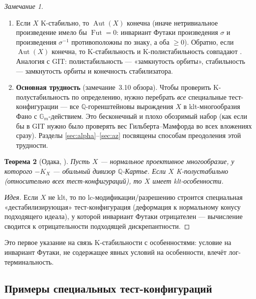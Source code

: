 \documentclass[11pt,a4paper]{article}
\theoremstyle{plain}
\newtheorem{theorem}{Теорема}[section]
\theoremstyle{definition}
\theoremstyle{remark}
\newtheorem{remark}[theorem]{Замечание}
\newcommand{\Q}{\mathbb{Q}}
\newcommand{\Gm}{\mathbb{G}_m}
\DeclareMathOperator{\Aut}{Aut}
\DeclareMathOperator{\Fut}{Fut}
\begin{document}
\begin{remark}\label{rem:BX}
\begin{enumerate}
\item Если $X$ K-стабильно, то $\Aut(X)$ конечна (иначе нетривиальное произведение имело бы
$\Fut=0$: инвариант Футаки произведения $\sigma$ и произведения $\sigma^{-1}$ противоположны по
знаку, а оба $\ge0$). Обратно, если $\Aut(X)$ конечна, то K-стабильность и K-полистабильность
совпадают \cite[BX19]{BX}. Аналогия с GIT: полистабильность --- «замкнутость орбиты»,
стабильность --- замкнутость орбиты и конечность стабилизатора.
\item \textbf{Основная трудность} (замечание~3.10 обзора). Чтобы проверить K-полустабильность по
определению, нужно перебрать \emph{все} специальные тест-конфигурации --- все $\Q$-горенштейновы
вырождения $X$ в klt-многообразия Фано с $\Gm$-действием. Это бесконечный и плохо обозримый набор
(как если бы в GIT нужно было проверять вес Гильберта--Мамфорда во всех вложениях сразу). Разделы
\ref{sec:alpha}--\ref{sec:az} посвящены способам преодоления этой трудности.
\end{enumerate}
\end{remark}

\begin{theorem}[{Одака, \cite{Oda13}}]\label{thm:Odaka}
Пусть $X$ --- нормальное проективное многообразие, у которого $-K_X$ --- обильный дивизор $\Q$-Картье. Если $X$
K-полустабильно \textup{(}относительно всех тест-конфигураций\textup{)}, то $X$ имеет klt-особенности.
\end{theorem}

\begin{proof}[Идея]
Если $X$ не klt, то по lc-модификации/разрешению строится специальная «дестабилизирующая»
тест-конфигурация (деформация к нормальному конусу подходящего идеала), у которой инвариант Футаки
отрицателен --- вычисление сводится к отрицательности подходящей дискрепантности.
\end{proof}

Это первое указание на связь K-стабильности с особенностями: условие на инвариант Футаки,
не содержащее явных условий на особенности, влечёт лог-терминальность.

\subsection{Примеры специальных тест-конфигураций}
\end{document}
